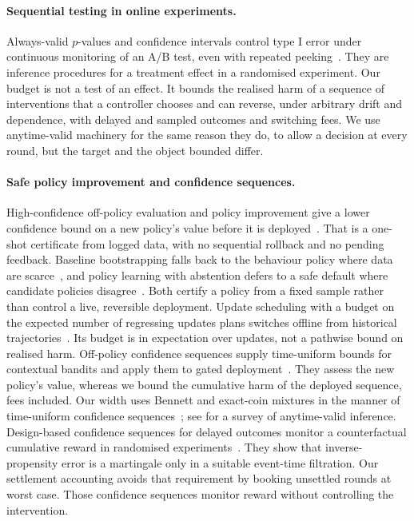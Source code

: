 \documentclass[10pt]{article}
\theoremstyle{plain}
\theoremstyle{definition}
\begin{document}
\paragraph{Sequential testing in online experiments.}
Always-valid $p$-values and confidence intervals control type I error under continuous monitoring of an A/B test, even with repeated peeking~\citep{johari2017peeking,johari2022always}. They are inference procedures for a treatment effect in a randomised experiment. Our budget is not a test of an effect. It bounds the realised harm of a sequence of interventions that a controller chooses and can reverse, under arbitrary drift and dependence, with delayed and sampled outcomes and switching fees. We use anytime-valid machinery for the same reason they do, to allow a decision at every round, but the target and the object bounded differ.

\paragraph{Safe policy improvement and confidence sequences.}
High-confidence off-policy evaluation and policy improvement give a lower confidence bound on a new policy's value before it is deployed~\citep{thomas2015hcope,thomas2015hcpi}. That is a one-shot certificate from logged data, with no sequential rollback and no pending feedback. Baseline bootstrapping falls back to the behaviour policy where data are scarce~\citep{laroche2019spibb}, and policy learning with abstention defers to a safe default where candidate policies disagree~\citep{sawarni2025abstention}. Both certify a policy from a fixed sample rather than control a live, reversible deployment. Update scheduling with a budget on the expected number of regressing updates plans switches offline from historical trajectories~\citep{zhou2026metapolicy}. Its budget is in expectation over updates, not a pathwise bound on realised harm. Off-policy confidence sequences supply time-uniform bounds for contextual bandits and apply them to gated deployment~\citep{karampatziakis2021offpolicy}. They assess the new policy's value, whereas we bound the cumulative harm of the deployed sequence, fees included. Our width uses Bennett and exact-coin mixtures in the manner of time-uniform confidence sequences~\citep{howard2021time,waudbysmith2024betting}; see \citet{ramdas2023savi} for a survey of anytime-valid inference. Design-based confidence sequences for delayed outcomes monitor a counterfactual cumulative reward in randomised experiments~\citep{lindon2026design}. They show that inverse-propensity error is a martingale only in a suitable event-time filtration. Our settlement accounting avoids that requirement by booking unsettled rounds at worst case. Those confidence sequences monitor reward without controlling the intervention.
\end{document}
